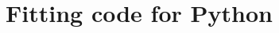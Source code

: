 \documentclass[a4paper, 10pt, nanum]{CSUniSchoolLabReport}
\begin{document}

\section{Fitting code for Python}




\end{document}
